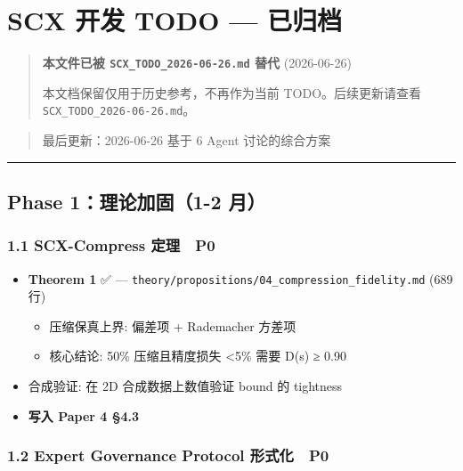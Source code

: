 \documentclass[
  12pt,
]{ctexart}
\author{SCX}
\date{2026}
\providecommand{\tightlist}{%
  \setlength{\itemsep}{0pt}\setlength{\parskip}{0pt}}
\begin{document}
\section{SCX 开发 TODO ---
已归档}\label{scx-ux5f00ux53d1-todo-ux5df2ux5f52ux6863}

\begin{quote}
\textbf{本文件已被 \texttt{SCX\_TODO\_2026-06-26.md} 替代} (2026-06-26)

本文档保留仅用于历史参考，不再作为当前 TODO。后续更新请查看
\texttt{SCX\_TODO\_2026-06-26.md}。
\end{quote}

\begin{quote}
最后更新：2026-06-26 \textbar{} 基于 6 Agent 讨论的综合方案
\end{quote}

\begin{center}\rule{0.5\linewidth}{0.5pt}\end{center}

\subsection{Phase 1：理论加固（1-2
月）}\label{phase-1ux7406ux8bbaux52a0ux56fa1-2-ux6708}

\subsubsection{1.1 SCX-Compress 定理 🔴
P0}\label{scx-compress-ux5b9aux7406-p0}

\begin{itemize}
\tightlist
\item[$\boxtimes$]
  \textbf{Theorem 1} ✅ ---
  \texttt{theory/propositions/04\_compression\_fidelity.md} (689行)

  \begin{itemize}
  \tightlist
  \item
    压缩保真上界: 偏差项 + Rademacher 方差项
  \item
    核心结论: 50\% 压缩且精度损失 \textless5\% 需要 D(s) ≥ 0.90
  \end{itemize}
\item[$\square$]
  合成验证: 在 2D 合成数据上数值验证 bound 的 tightness
\item[$\square$]
  \textbf{写入 Paper 4 §4.3}
\end{itemize}

\subsubsection{1.2 Expert Governance Protocol 形式化 🔴
P0}\label{expert-governance-protocol-ux5f62ux5f0fux5316-p0}
\end{document}
